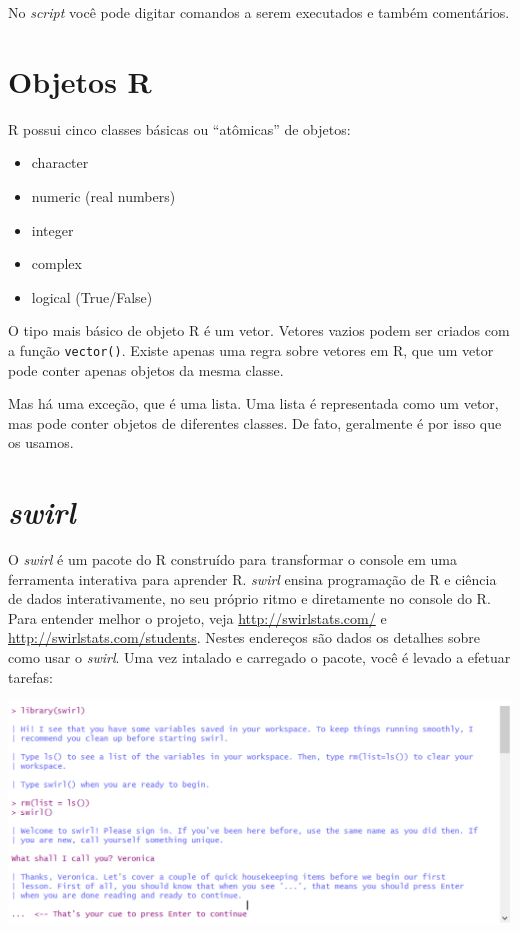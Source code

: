 \documentclass[]{book}
\begin{document}
No \emph{script} você pode digitar comandos a serem executados e também comentários.

\hypertarget{objetos-r}{%
\section{Objetos R}\label{objetos-r}}

R possui cinco classes básicas ou ``atômicas'' de objetos:

\begin{itemize}
\item
  character
\item
  numeric (real numbers)
\item
  integer
\item
  complex
\item
  logical (True/False)
\end{itemize}

O tipo mais básico de objeto R é um vetor. Vetores vazios podem ser criados com a função \texttt{vector()}. Existe apenas uma regra sobre vetores em R, que um vetor pode conter apenas objetos da mesma classe.

Mas há uma exceção, que é uma lista. Uma lista é representada como um vetor, mas pode conter objetos de diferentes classes. De fato, geralmente é por isso que os usamos.

\hypertarget{swirl}{%
\section{\texorpdfstring{\emph{swirl}}{swirl}}\label{swirl}}

O \emph{swirl} é um pacote do R construído para transformar o console em uma ferramenta interativa para aprender R. \emph{swirl} ensina programação de R e ciência de dados interativamente, no seu próprio ritmo e diretamente no console do R. Para entender melhor o projeto, veja \url{http://swirlstats.com/} e \url{http://swirlstats.com/students}. Nestes endereços são dados os detalhes sobre como usar o \emph{swirl}. Uma vez intalado e carregado o pacote, você é levado a efetuar tarefas:

\begin{center}\includegraphics[width=0.9\linewidth]{imagens/swirl} \end{center}
\end{document}
